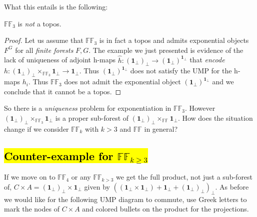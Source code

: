 What this entails is the following:
\begin{thm}\label{thm:ff3nottopos}
	$\mathbb{FF}_3$ is \emph{not} a topos.
\end{thm}
\begin{proof}
	Let us assume that $\mathbb{FF}_3$ is in fact a topos and admits exponential objects $F^G$ for all \emph{finite forests} $F,G$. \newline
	The example we just presented is evidence of the lack of uniqueness of adjoint h-maps $\hat{h} : (\textbf{1}_\bot)_\bot \rightarrow (\textbf{1}_\bot) ^ {\textbf{1}_\bot}$ that \emph{encode} $h :  (\textbf{1}_\bot)_\bot \times_{\mathbb{FF}_3} \textbf{1}_\bot \rightarrow \textbf{1}_\bot$.
	\newline
	Thus $(\textbf{1}_\bot) ^ {\textbf{1}_\bot}$ does not satisfy the UMP for the h-maps $h_i$.
	\newline
	Thus $\mathbb{FF}_3$ does not admit the exponential object $(\textbf{1}_\bot) ^ {\textbf{1}_\bot}$ and we conclude that it cannot be a topos.
\end{proof}
So there is a \emph{uniqueness} problem for exponentiation in $\mathbb{FF}_3$.
\newline
However $(\textbf{1}_\bot)_\bot \times_{\mathbb{FF}_3} \textbf{1}_\bot$ is a proper sub-forest of $(\textbf{1}_\bot)_\bot \times_{\mathbb{FF}} \textbf{1}_\bot$. 
\newline
How does the situation change if we consider $\mathbb{FF}_k$ with $k>3$ and $\mathbb{FF}$ in general?



\newpage
\subsection{\hl{Counter-example for $\mathbb{FF}_{k \geq 3}$}}

If we move on to $\mathbb{FF}_4$ or any $\mathbb{FF}_{k>3}$ we get the full product, not just a sub-forest of, $C \times A= (\textbf{1}_\bot)_\bot \times \textbf{1}_\bot$ given by  $( (\textbf{1}_\bot \times \textbf{1}_\bot) + \textbf{1}_\bot +  (\textbf{1}_\bot)_\bot)_\bot$.
\newline
As before we would like for the following UMP diagram to commute, use Greek letters to mark the nodes of $C \times A$ and colored bullets on the product for the projections.

